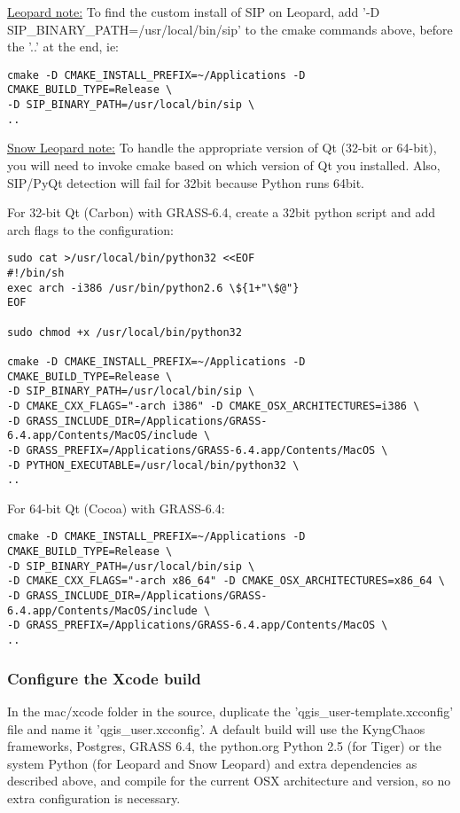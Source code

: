 \underline{Leopard note:} To find the custom install of SIP on Leopard, add
'-D SIP\_BINARY\_PATH=/usr/local/bin/sip' to the cmake commands above,
before the '..' at the end, ie:

\begin{verbatim}
cmake -D CMAKE_INSTALL_PREFIX=~/Applications -D CMAKE_BUILD_TYPE=Release \
-D SIP_BINARY_PATH=/usr/local/bin/sip \
..
\end{verbatim}

\underline{Snow Leopard note:} To handle the appropriate version of Qt (32-bit or 64-bit), you will need to invoke cmake based on which version of Qt you installed.  Also, SIP/PyQt detection will fail for 32bit because Python runs 64bit.

For 32-bit Qt (Carbon) with GRASS-6.4, create a 32bit python script and add arch flags to the configuration:

\begin{verbatim}
sudo cat >/usr/local/bin/python32 <<EOF
#!/bin/sh
exec arch -i386 /usr/bin/python2.6 \${1+"\$@"}
EOF

sudo chmod +x /usr/local/bin/python32

cmake -D CMAKE_INSTALL_PREFIX=~/Applications -D CMAKE_BUILD_TYPE=Release \
-D SIP_BINARY_PATH=/usr/local/bin/sip \
-D CMAKE_CXX_FLAGS="-arch i386" -D CMAKE_OSX_ARCHITECTURES=i386 \
-D GRASS_INCLUDE_DIR=/Applications/GRASS-6.4.app/Contents/MacOS/include \
-D GRASS_PREFIX=/Applications/GRASS-6.4.app/Contents/MacOS \
-D PYTHON_EXECUTABLE=/usr/local/bin/python32 \
..
\end{verbatim}

For 64-bit Qt (Cocoa) with GRASS-6.4:

\begin{verbatim}
cmake -D CMAKE_INSTALL_PREFIX=~/Applications -D CMAKE_BUILD_TYPE=Release \
-D SIP_BINARY_PATH=/usr/local/bin/sip \
-D CMAKE_CXX_FLAGS="-arch x86_64" -D CMAKE_OSX_ARCHITECTURES=x86_64 \
-D GRASS_INCLUDE_DIR=/Applications/GRASS-6.4.app/Contents/MacOS/include \
-D GRASS_PREFIX=/Applications/GRASS-6.4.app/Contents/MacOS \
..
\end{verbatim}

\subsubsection{Configure the Xcode build}
In the mac/xcode folder in the source, duplicate the 'qgis\_user-template.xcconfig'
file and name it 'qgis\_user.xcconfig'. A default build will use the KyngChaos
frameworks, Postgres, GRASS 6.4, the python.org Python 2.5 (for Tiger)
or the system Python (for Leopard and Snow Leopard) and extra dependencies
as described above, and compile for the current OSX architecture and version, so no
extra configuration is necessary.

